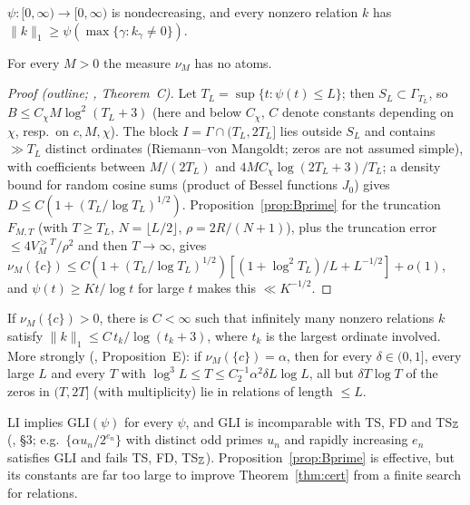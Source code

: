 \begin{hypothesis}
$\psi:[0,\infty)\to[0,\infty)$ is nondecreasing, and every nonzero relation $k$ has $\|k\|_1\ge\psi(\max\{\gamma:k_\gamma\ne0\})$.
\end{hypothesis}

\begin{theorem}\label{thm:GLI}
For every $M>0$ the measure $\nu_M$ has no atoms.
\end{theorem}

\begin{proof}[Proof (outline; , Theorem~C)]
Let $T_L=\sup\{t:\psi(t)\le L\}$; then $S_L\subset\Gamma_{T_L}$, so $B\le C_\chi M\log^2(T_L+3)$ (here and below $C_\chi$, $C$ denote constants depending on $\chi$, resp.\ on $c,M,\chi$). The block $I=\Gamma\cap(T_L,2T_L]$ lies outside $S_L$ and contains $\gg T_L$ distinct ordinates (Riemann--von Mangoldt; zeros are not assumed simple), with coefficients between $M/(2T_L)$ and $4MC_\chi\log(2T_L+3)/T_L$; a density bound for random cosine sums (product of Bessel functions $J_0$) gives $D\le C(1+(T_L/\log T_L)^{1/2})$. Proposition~\ref{prop:Bprime} for the truncation $F_{M,T}$ (with $T\ge T_L$, $N=\lfloor L/2\rfloor$, $\rho=2R/(N+1)$), plus the truncation error $\le4V_M^{>T}/\rho^2$ and then $T\to\infty$, gives $\nu_M(\{c\})\le C(1+(T_L/\log T_L)^{1/2})[(1+\log^2T_L)/L+L^{-1/2}]+o(1)$, and $\psi(t)\ge Kt/\log t$ for large $t$ makes this $\ll K^{-1/2}$.
\end{proof}

\begin{corollary}\label{cor:GLIatom}
If $\nu_M(\{c\})>0$, there is $C<\infty$ such that infinitely many nonzero relations $k$ satisfy $\|k\|_1\le C\,t_k/\log(t_k+3)$, where $t_k$ is the largest ordinate involved. More strongly (, Proposition~E): if $\nu_M(\{c\})=\alpha$, then for every $\delta\in(0,1]$, every large $L$ and every $T$ with $\log^3L\le T\le C_2^{-1}\alpha^2\delta L\log L$, all but $\delta T\log T$ of the zeros in $(T,2T]$ (with multiplicity) lie in relations of length $\le L$.
\end{corollary}

LI implies GLI$(\psi)$ for every $\psi$, and GLI is incomparable with TS, FD and TS$_\mathbb Z$ (, \S3; e.g.\ $\{\alpha u_n/2^{e_n}\}$ with distinct odd primes $u_n$ and rapidly increasing $e_n$ satisfies GLI and fails TS, FD, TS$_\mathbb Z$). Proposition~\ref{prop:Bprime} is effective, but its constants are far too large to improve Theorem~\ref{thm:cert} from a finite search for relations.

